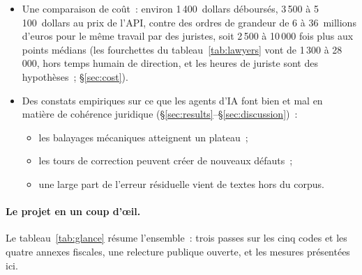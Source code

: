 \documentclass[11pt,a4paper]{article}
\begin{document}
\begin{itemize}
  \item Une comparaison de coût~: environ 1\,400~dollars déboursés, 3\,500 à 5\,100~dollars au prix de l'API, contre des ordres de grandeur de 6 à 36~millions d'euros pour le même travail par des juristes, soit 2\,500 à 10\,000 fois plus aux points médians (les fourchettes du tableau~\ref{tab:lawyers} vont de 1\,300 à 28\,000, hors temps humain de direction, et les heures de juriste sont des hypothèses~; \S\ref{sec:cost}).
  \item Des constats empiriques sur ce que les agents d'IA font bien et mal en matière de cohérence juridique (\S\ref{sec:results}--\S\ref{sec:discussion})~:
  \begin{itemize}
    \item les balayages mécaniques atteignent un plateau~;
    \item les tours de correction peuvent créer de nouveaux défauts~;
    \item une large part de l'erreur résiduelle vient de textes hors du corpus.
  \end{itemize}
\end{itemize}

\paragraph{Le projet en un coup d'\oe{}il.}
Le tableau~\ref{tab:glance} résume l'ensemble~: trois passes sur les cinq codes et les quatre annexes fiscales, une relecture publique ouverte, et les mesures présentées ici.
\end{document}

